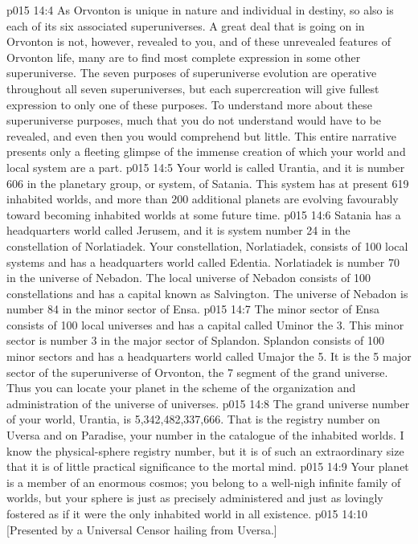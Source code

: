 \vs p015 14:4 As Orvonton is unique in nature and individual in destiny, so also is each of its six associated superuniverses. A great deal that is going on in Orvonton is not, however, revealed to you, and of these unrevealed features of Orvonton life, many are to find most complete expression in some other superuniverse. The seven purposes of superuniverse evolution are operative throughout all seven superuniverses, but each supercreation will give fullest expression to only one of these purposes. To understand more about these superuniverse purposes, much that you do not understand would have to be revealed, and even then you would comprehend but little. This entire narrative presents only a fleeting glimpse of the immense creation of which your world and local system are a part.
\vs p015 14:5 \pc Your world is called Urantia, and it is number 606 in the planetary group, or system, of Satania. This system has at present 619 inhabited worlds, and more than 200 additional planets are evolving favourably toward becoming inhabited worlds at some future time.
\vs p015 14:6 Satania has a headquarters world called Jerusem, and it is system number 24 in the constellation of Norlatiadek. Your constellation, Norlatiadek, consists of 100 local systems and has a headquarters world called Edentia. Norlatiadek is number 70 in the universe of Nebadon. The local universe of Nebadon consists of 100 constellations and has a capital known as Salvington. The universe of Nebadon is number 84 in the minor sector of Ensa.
\vs p015 14:7 The minor sector of Ensa consists of 100 local universes and has a capital called Uminor the 3. This minor sector is number 3 in the major sector of Splandon. Splandon consists of 100 minor sectors and has a headquarters world called Umajor the 5. It is the 5 major sector of the superuniverse of Orvonton, the 7 segment of the grand universe. Thus you can locate your planet in the scheme of the organization and administration of the universe of universes.
\vs p015 14:8 The grand universe number of your world, Urantia, is 5,342,482,337,666. That is the registry number on Uversa and on Paradise, your number in the catalogue of the inhabited worlds. I know the physical\hyp{}sphere registry number, but it is of such an extraordinary size that it is of little practical significance to the mortal mind.
\vs p015 14:9 \pc Your planet is a member of an enormous cosmos; you belong to a well\hyp{}nigh infinite family of worlds, but your sphere is just as precisely administered and just as lovingly fostered as if it were the only inhabited world in all existence.
\vsetoff
\vs p015 14:10 [Presented by a Universal Censor hailing from Uversa.]
\quizlink
